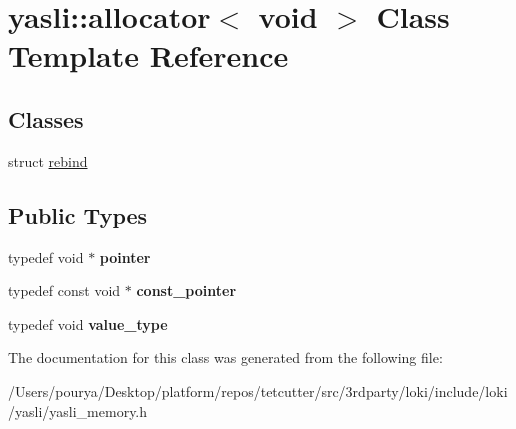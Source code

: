 \hypertarget{classyasli_1_1allocator_3_01void_01_4}{}\section{yasli\+:\+:allocator$<$ void $>$ Class Template Reference}
\label{classyasli_1_1allocator_3_01void_01_4}
\subsection*{Classes}
\begin{DoxyCompactItemize}
\item 
struct \hyperlink{structyasli_1_1allocator_3_01void_01_4_1_1rebind}{rebind}
\end{DoxyCompactItemize}
\subsection*{Public Types}
\begin{DoxyCompactItemize}
\item 
\hypertarget{classyasli_1_1allocator_3_01void_01_4_abfced39fd698a41bf3dd330fe136ab71}{}typedef void $\ast$ {\bfseries pointer}\label{classyasli_1_1allocator_3_01void_01_4_abfced39fd698a41bf3dd330fe136ab71}

\item 
\hypertarget{classyasli_1_1allocator_3_01void_01_4_a0dc9454807cd1680e697877f325323e8}{}typedef const void $\ast$ {\bfseries const\+\_\+pointer}\label{classyasli_1_1allocator_3_01void_01_4_a0dc9454807cd1680e697877f325323e8}

\item 
\hypertarget{classyasli_1_1allocator_3_01void_01_4_aea3755392cf472581982ccb62c9c842f}{}typedef void {\bfseries value\+\_\+type}\label{classyasli_1_1allocator_3_01void_01_4_aea3755392cf472581982ccb62c9c842f}

\end{DoxyCompactItemize}


The documentation for this class was generated from the following file\+:\begin{DoxyCompactItemize}
\item 
/\+Users/pourya/\+Desktop/platform/repos/tetcutter/src/3rdparty/loki/include/loki/yasli/yasli\+\_\+memory.\+h\end{DoxyCompactItemize}

